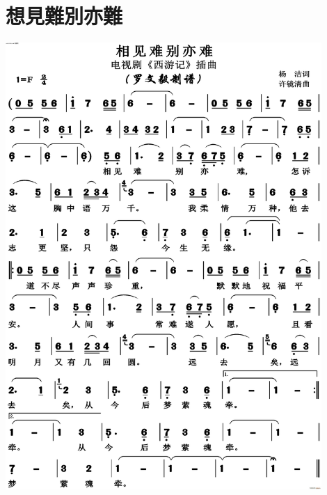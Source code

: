 \documentclass[cn,pad,twocol]{elegantbook}
\begin{document}
\section{想見難別亦難}
    \includegraphics[width=0.9\textwidth]{dongxiao/20201231-相见难别亦难}
\end{document}
